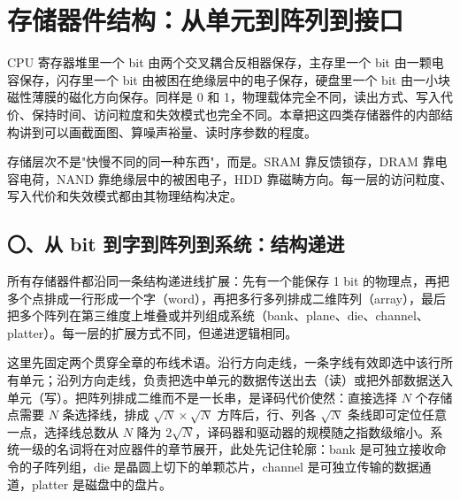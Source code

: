 \chapter{存储器件结构：从单元到阵列到接口}

CPU 寄存器堆里一个 bit 由两个交叉耦合反相器保存，主存里一个 bit 由一颗电容保存，闪存里一个 bit 由被困在绝缘层中的电子保存，硬盘里一个 bit 由一小块磁性薄膜的磁化方向保存。同样是 0 和 1，物理载体完全不同，读出方式、写入代价、保持时间、访问粒度和失效模式也完全不同。本章把这四类存储器件的内部结构讲到可以画截面图、算噪声裕量、读时序参数的程度。

\begin{keyidea}
存储层次不是"快慢不同的同一种东西"，而是。SRAM 靠反馈锁存，DRAM 靠电容电荷，NAND 靠绝缘层中的被困电子，HDD 靠磁畴方向。每一层的访问粒度、写入代价和失效模式都由其物理结构决定。
\end{keyidea}

\section{〇、从 bit 到字到阵列到系统：结构递进}

所有存储器件都沿同一条结构递进线扩展：先有一个能保存 1 bit 的物理点，再把多个点排成一行形成一个字（word），再把多行多列排成二维阵列（array），最后把多个阵列在第三维度上堆叠或并列组成系统（bank、plane、die、channel、platter）。每一层的扩展方式不同，但递进逻辑相同。

这里先固定两个贯穿全章的布线术语。沿行方向走线，一条字线有效即选中该行所有单元；沿列方向走线，负责把选中单元的数据传送出去（读）或把外部数据送入单元（写）。把阵列排成二维而不是一长串，是译码代价使然：直接选择 $N$ 个存储点需要 $N$ 条选择线，排成 $\sqrt{N}\times\sqrt{N}$ 方阵后，行、列各 $\sqrt{N}$ 条线即可定位任意一点，选择线总数从 $N$ 降为 $2\sqrt{N}$，译码器和驱动器的规模随之指数级缩小。系统一级的名词将在对应器件的章节展开，此处先记住轮廓：bank 是可独立接收命令的子阵列组，die 是晶圆上切下的单颗芯片，channel 是可独立传输的数据通道，platter 是磁盘中的盘片。

